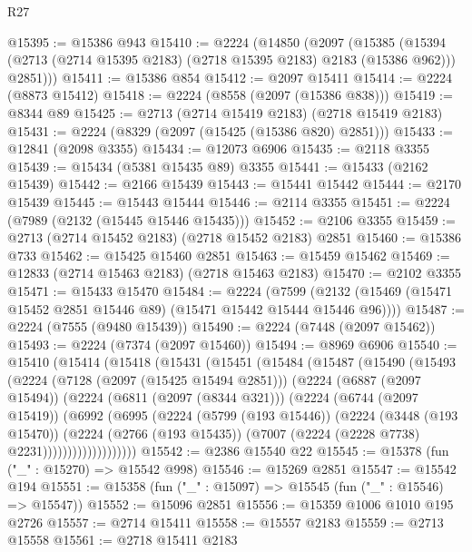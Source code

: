 \begin{lexlean}{R27}
\begin{coremodule}
@15395 := @15386 @943
@15410 := @2224
    (@14850
      (@2097
        (@15385
          (@15394 (@2713 (@2714 @15395 @2183) (@2718 @15395 @2183) @2183 (@15386 @962)))
          @2851)))
@15411 := @15386 @854
@15412 := @2097 @15411
@15414 := @2224 (@8873 @15412)
@15418 := @2224 (@8558 (@2097 (@15386 @838)))
@15419 := @8344 @89
@15425 := @2713 (@2714 @15419 @2183) (@2718 @15419 @2183)
@15431 := @2224 (@8329 (@2097 (@15425 (@15386 @820) @2851)))
@15433 := @12841 (@2098 @3355)
@15434 := @12073 @6906
@15435 := @2118 @3355
@15439 := @15434 (@5381 @15435 @89) @3355
@15441 := @15433 (@2162 @15439)
@15442 := @2166 @15439
@15443 := @15441 @15442
@15444 := @2170 @15439
@15445 := @15443 @15444
@15446 := @2114 @3355
@15451 := @2224 (@7989 (@2132 (@15445 @15446 @15435)))
@15452 := @2106 @3355
@15459 := @2713 (@2714 @15452 @2183) (@2718 @15452 @2183) @2851
@15460 := @15386 @733
@15462 := @15425 @15460 @2851
@15463 := @15459 @15462
@15469 := @12833 (@2714 @15463 @2183) (@2718 @15463 @2183)
@15470 := @2102 @3355
@15471 := @15433 @15470
@15484 := @2224
    (@7599 (@2132 (@15469 (@15471 @15452 @2851 @15446 @89) (@15471 @15442 @15444 @15446 @96))))
@15487 := @2224 (@7555 (@9480 @15439))
@15490 := @2224 (@7448 (@2097 @15462))
@15493 := @2224 (@7374 (@2097 @15460))
@15494 := @8969 @6906
@15540 := @15410
    (@15414
      (@15418
        (@15431
          (@15451
            (@15484
              (@15487
                (@15490
                  (@15493
                    (@2224
                      (@7128 (@2097 (@15425 @15494 @2851)))
                      (@2224
                        (@6887 (@2097 @15494))
                        (@2224
                          (@6811 (@2097 (@8344 @321)))
                          (@2224
                            (@6744 (@2097 @15419))
                            (@6992
                              (@6995
                                (@2224
                                  (@5799 (@193 @15446))
                                  (@2224
                                    (@3448 (@193 @15470))
                                    (@2224
                                      (@2766 (@193 @15435))
                                      (@7007 (@2224 (@2228 @7738) @2231)))))))))))))))))))
@15542 := @2386 @15540 @22
@15545 := @15378 (fun ("_" : @15270) => @15542 @998)
@15546 := @15269 @2851
@15547 := @15542 @194
@15551 := @15358 (fun ("_" : @15097) => @15545 (fun ("_" : @15546) => @15547))
@15552 := @15096 @2851
@15556 := @15359 @1006 @1010 @195 @2726
@15557 := @2714 @15411
@15558 := @15557 @2183
@15559 := @2713 @15558
@15561 := @2718 @15411 @2183

\end{coremodule}
\end{lexlean}
